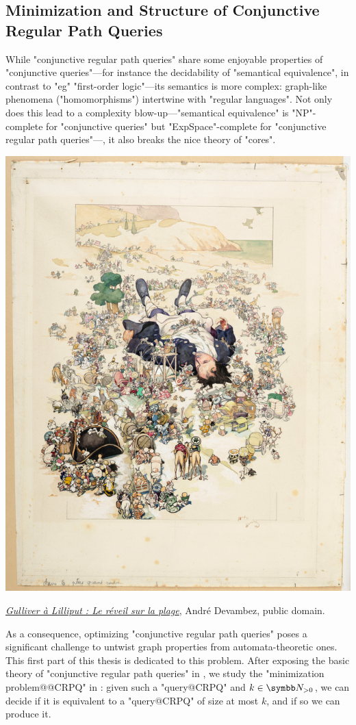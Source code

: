 \subsection{Minimization and Structure of Conjunctive Regular Path Queries}

While "conjunctive regular path queries" share some enjoyable properties
of "conjunctive queries"---for instance the decidability of "semantical equivalence",
in contrast to "eg" "first-order logic"---its semantics is more complex:
graph-like phenomena ("homomorphisms") intertwine with "regular languages".
Not only does this lead to a complexity blow-up---"semantical equivalence" is "NP"-complete
for "conjunctive queries" but "ExpSpace"-complete for "conjunctive regular path queries"---,
it also breaks the nice theory of "cores".

\begin{marginfigure}[5em]
	\centering
	\includegraphics[width=\linewidth]{fig/intro/Gulliver.jpg}
	\caption{\href{https://www.musee-orsay.fr/fr/oeuvres/gulliver-lilliput-le-reveil-sur-la-plage-248152}{\emph{Gulliver à Lilliput : Le réveil sur la plage}}, André Devambez, public domain.}
\end{marginfigure}
As a consequence, optimizing "conjunctive regular path queries" poses
a significant challenge to untwist graph properties from automata-theoretic ones.
This first part of this thesis is dedicated to this problem.
After exposing the basic theory of "conjunctive regular path queries"
in , we study
the "minimization problem@@CRPQ" in :
given such a "query@CRPQ" and $k\in\Np$, we can decide if it is equivalent to a "query@CRPQ"
of size at most $k$, and if so we can produce it.

